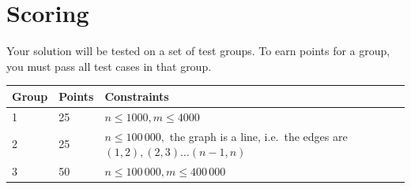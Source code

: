 \section*{Scoring}
Your solution will be tested on a set of test groups. To earn points for a group, you must pass all test cases in that group.

\noindent
\begin{tabular}{| l | l | l | l |}
\hline
Group & Points & Constraints \\ \hline
	1     & 25 & $n \le 1000, m \le 4000$ \\ \hline
	2     & 25 & $n \le 100\,000,$ the graph is a line, i.e.\ the edges are $(1,2),(2,3) \dots (n-1,n)$  \\ \hline
	3     & 50 & $n \le 100\,000, m \le 400\,000$ \\ \hline

\end{tabular}
